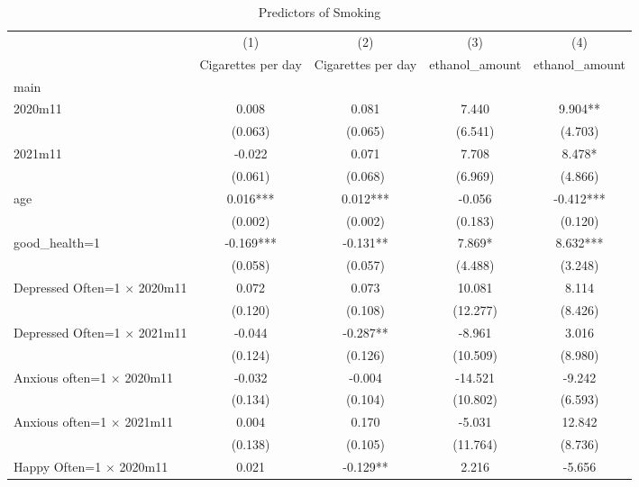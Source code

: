 \begin{table}[htbp]\centering
\def\sym#1{\ifmmode^{#1}\else\(^{#1}\)\fi}
\caption{Predictors of Smoking}
\begin{tabular}{l*{4}{c}}
\toprule
                &\multicolumn{1}{c}{(1)}&\multicolumn{1}{c}{(2)}&\multicolumn{1}{c}{(3)}&\multicolumn{1}{c}{(4)}\\
                &\multicolumn{1}{c}{Cigarettes per day}&\multicolumn{1}{c}{Cigarettes per day}&\multicolumn{1}{c}{ethanol\_amount}&\multicolumn{1}{c}{ethanol\_amount}\\
\midrule
main            &            &            &            &            \\
2020m11         &    0.008   &    0.081   &    7.440   &    9.904** \\
                &  (0.063)   &  (0.065)   &  (6.541)   &  (4.703)   \\
2021m11         &   -0.022   &    0.071   &    7.708   &    8.478*  \\
                &  (0.061)   &  (0.068)   &  (6.969)   &  (4.866)   \\
age             &    0.016***&    0.012***&   -0.056   &   -0.412***\\
                &  (0.002)   &  (0.002)   &  (0.183)   &  (0.120)   \\
good\_health=1   &   -0.169***&   -0.131** &    7.869*  &    8.632***\\
                &  (0.058)   &  (0.057)   &  (4.488)   &  (3.248)   \\
Depressed Often=1 $\times$ 2020m11&    0.072   &    0.073   &   10.081   &    8.114   \\
                &  (0.120)   &  (0.108)   & (12.277)   &  (8.426)   \\
Depressed Often=1 $\times$ 2021m11&   -0.044   &   -0.287** &   -8.961   &    3.016   \\
                &  (0.124)   &  (0.126)   & (10.509)   &  (8.980)   \\
Anxious often=1 $\times$ 2020m11&   -0.032   &   -0.004   &  -14.521   &   -9.242   \\
                &  (0.134)   &  (0.104)   & (10.802)   &  (6.593)   \\
Anxious often=1 $\times$ 2021m11&    0.004   &    0.170   &   -5.031   &   12.842   \\
                &  (0.138)   &  (0.105)   & (11.764)   &  (8.736)   \\
Happy Often=1 $\times$ 2020m11&    0.021   &   -0.129** &    2.216   &   -5.656   \\

\end{tabular}
\end{table}
